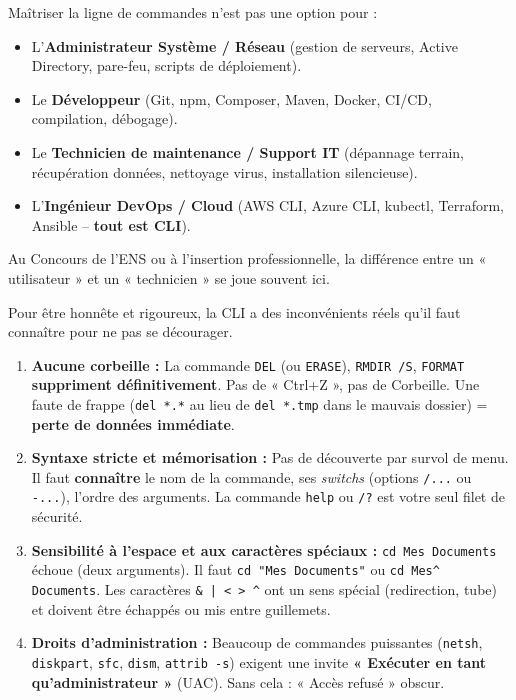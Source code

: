 \documentclass[11pt]{article}
\newcommand{\cle}[1]{{\popxbold\color{popdark}#1}}
\newcounter{popsec}
\newcounter{popsub}
\newcommand{\courssub}[1]{%
  \stepcounter{popsub}%
  \par\vspace{9pt}\noindent{\popxbold\fontsize{11.5}{13}\selectfont\color{popink}{\color{poporange}\thepopsec.\thepopsub}\hspace{6pt}#1}\par\nopagebreak\vspace{4pt}
}
\begin{document}
\begin{aretenir}
Maîtriser la ligne de commandes n'est pas une option pour :
\begin{itemize}
    \item L'\textbf{Administrateur Système / Réseau} (gestion de serveurs, Active Directory, pare-feu, scripts de déploiement).
    \item Le \textbf{Développeur} (Git, npm, Composer, Maven, Docker, CI/CD, compilation, débogage).
    \item Le \textbf{Technicien de maintenance / Support IT} (dépannage terrain, récupération données, nettoyage virus, installation silencieuse).
    \item L'\textbf{Ingénieur DevOps / Cloud} (\cle{AWS CLI}, \cle{Azure CLI}, \cle{kubectl}, \cle{Terraform}, \cle{Ansible} -- \textbf{tout est CLI}).
\end{itemize}
Au Concours de l'ENS ou à l'insertion professionnelle, la différence entre un « utilisateur » et un « technicien » se joue souvent ici.
\end{aretenir}

\courssub{Limites et vigilance nécessaire}

Pour être honnête et rigoureux, la \cle{CLI} a des inconvénients réels qu'il faut connaître pour ne pas se décourager.

\begin{attention}
\begin{enumerate}
    \item \textbf{Aucune corbeille :} La commande \texttt{DEL} (ou \texttt{ERASE}), \texttt{RMDIR /S}, \texttt{FORMAT} \textbf{suppriment définitivement}. Pas de « Ctrl+Z », pas de Corbeille. Une faute de frappe (\texttt{del *.*} au lieu de \texttt{del *.tmp} dans le mauvais dossier) = \textbf{perte de données immédiate}.
    \item \textbf{Syntaxe stricte et mémorisation :} Pas de découverte par survol de menu. Il faut \textbf{connaître} le nom de la commande, ses \emph{switchs} (options \texttt{/...} ou \texttt{-...}), l'ordre des arguments. La commande \texttt{help} ou \texttt{/?} est votre seul filet de sécurité.
    \item \textbf{Sensibilité à l'espace et aux caractères spéciaux :} \texttt{cd Mes Documents} échoue (deux arguments). Il faut \texttt{cd "Mes Documents"} ou \texttt{cd Mes\textasciicircum{} Documents}. Les caractères \texttt{\& | < > \textasciicircum{}} ont un sens spécial (redirection, tube) et doivent être échappés ou mis entre guillemets.
    \item \textbf{Droits d'administration :} Beaucoup de commandes puissantes (\texttt{netsh}, \texttt{diskpart}, \texttt{sfc}, \texttt{dism}, \texttt{attrib -s}) exigent une invite \textbf{« Exécuter en tant qu'administrateur »} (\cle{UAC}). Sans cela : « Accès refusé » obscur.
\end{enumerate}
\end{attention}
\end{document}
